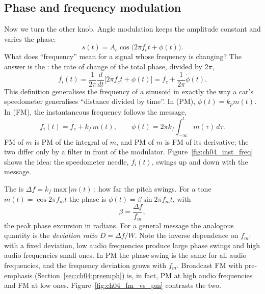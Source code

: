 \subsection{Phase and frequency modulation}

Now we turn the other knob. Angle modulation keeps the amplitude constant and varies the phase:
\begin{equation}
s(t)=A_c\cos\big(2\pi f_c t+\phi(t)\big).
\end{equation}
What does ``frequency'' mean for a signal whose frequency is changing? The answer is the
: the rate of change of the total phase, divided by $2\pi$,
\begin{equation}
f_i(t)=\frac{1}{2\pi}\frac{d}{dt}\big[2\pi f_ct+\phi(t)\big]=f_c+\frac{1}{2\pi}\dot\phi(t).
\label{eq:ch04:finst}
\end{equation}
This definition generalises the frequency of a sinusoid in exactly the way a car's speedometer
generalises ``distance divided by time''. In  (PM), $\phi(t)=k_p m(t)$. In
 (FM), the instantaneous frequency follows the message,
\begin{equation}
f_i(t)=f_c+k_f\,m(t),\qquad \phi(t)=2\pi k_f\int_{-\infty}^t m(\tau)\,d\tau.
\label{eq:ch04:fm}
\end{equation}
FM of $m$ is PM of the integral of $m$, and PM of $m$ is FM of its derivative; the two differ only by a
filter in front of the modulator. Figure~\ref{fig:ch04_inst_freq} shows the idea: the speedometer needle,
$f_i(t)$, swings up and down with the message.

The  is $\Delta f=k_f\max|m(t)|$: how far the pitch swings. For a tone
$m(t)=\cos2\pi f_mt$ the phase is $\phi(t)=\beta\sin2\pi f_mt$, with 
\begin{equation}
\beta=\frac{\Delta f}{f_m},
\end{equation}
the peak phase excursion in radians. For a general message the analogous quantity is the
\emph{deviation ratio} $D=\Delta f/W$. Note the inverse dependence on $f_m$: with a fixed deviation, low
audio frequencies produce large phase swings and high audio frequencies small ones. In PM the phase swing
is the same for all audio frequencies, and the frequency deviation grows with $f_m$. Broadcast FM with
pre-emphasis (Section~\ref{sec:ch04:preemph}) is, in fact, PM at high audio frequencies and FM at low ones.
Figure~\ref{fig:ch04_fm_vs_pm} contrasts the two.


